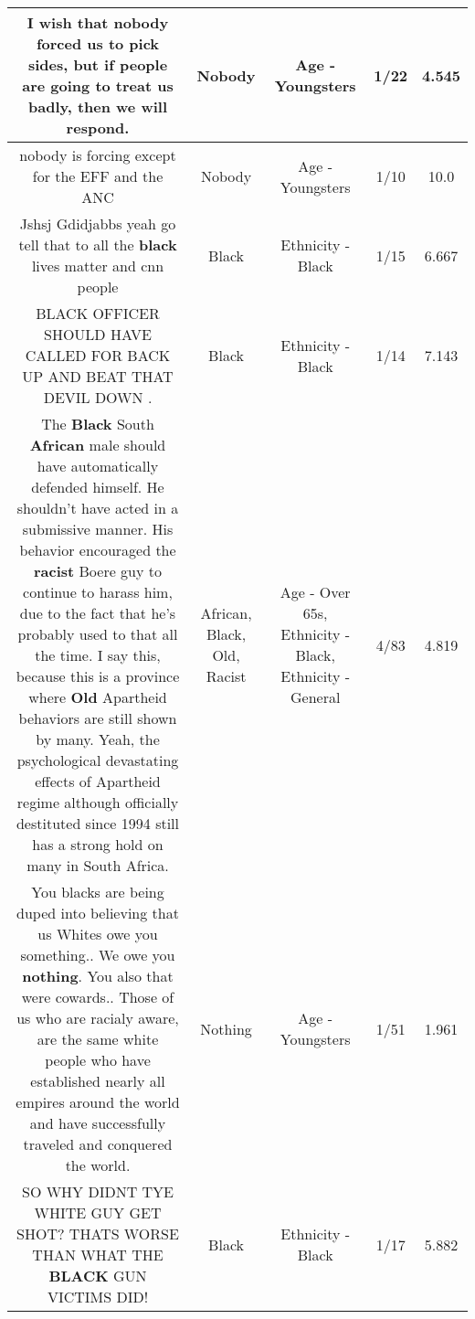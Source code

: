 \documentclass[11pt]{article}
\newlength\mylength
\begin{document}
\begin{center}
\begin{longtable}{|C{.65\mylength}|C{.30\mylength}|C{.12\mylength}|C{.12\mylength}|C{.12\mylength}|}
  \small I wish that \textbf{nobody} forced us to pick sides,  but if  people are going to treat us badly, then we will respond.\normalsize   & Nobody & Age - Youngsters & 1/22 & 4.545 \\  \hline
  \small nobody is forcing except for the EFF and the ANC\normalsize   & Nobody & Age - Youngsters & 1/10 & 10.0 \\  \hline
  \small Jshsj Gdidjabbs yeah go tell that to all the \textbf{black} lives matter and cnn people\normalsize   & Black & Ethnicity - Black & 1/15 & 6.667 \\  \hline
  \small BLACK OFFICER SHOULD HAVE CALLED FOR BACK UP AND BEAT THAT DEVIL DOWN .\normalsize   & Black & Ethnicity - Black & 1/14 & 7.143 \\  \hline
  \small The \textbf{Black} South \textbf{African} male should have automatically defended himself. He shouldn't have acted in a submissive manner. His behavior encouraged the \textbf{racist} Boere guy to continue to harass him, due to the fact that he's probably used to that all the time. I say this, because this is a province where  \textbf{Old} Apartheid behaviors are still shown by many. Yeah, the psychological devastating effects of Apartheid regime although officially destituted since 1994 still has a strong hold on many in South Africa.\normalsize   & African, Black, Old, Racist & Age - Over 65s, Ethnicity - Black, Ethnicity - General & 4/83 & 4.819 \\  \hline
  \small You blacks are being duped into believing that us Whites owe you something.. We owe you \textbf{nothing}. You also that were cowards.. Those of us who are racialy aware, are the same white people who have established nearly all empires around the world and have successfully traveled and conquered the world.\normalsize   & Nothing & Age - Youngsters & 1/51 & 1.961 \\  \hline
  \small SO WHY DIDNT TYE WHITE GUY GET SHOT? THATS WORSE THAN WHAT THE \textbf{BLACK} GUN VICTIMS DID!\normalsize   & Black & Ethnicity - Black & 1/17 & 5.882 \\  \hline

\end{longtable}
\end{center}
\end{document}
